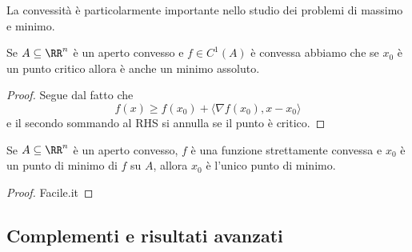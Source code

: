 \documentclass[11pt]{scrartcl}
\begin{document}
	La convessità è particolarmente importante nello studio dei problemi di massimo e minimo.
	\begin{proposition}
		Se $A\subseteq\RR^n$ è un aperto convesso e $f\in C^1(A)$ è convessa abbiamo che se $x_0$ è un punto critico allora è anche un minimo assoluto.
	\end{proposition}
	\begin{proof}
		Segue dal fatto che 
		$$f(x)\ge f(x_0)+\langle \nabla f(x_0),x-x_0\rangle$$
		e il secondo sommando al RHS si annulla se il punto è critico.
	\end{proof}
	\begin{proposition}
		Se $A\subseteq\RR^n$ è un aperto convesso, $f$ è una funzione strettamente convessa e $x_0$ è un punto di minimo di $f$ su $A$, allora $x_0$ è l'unico punto di minimo.
	\end{proposition}
	\begin{proof}
		Facile.it
	\end{proof}
	
	
	\subsection{Complementi e risultati avanzati}
	
\end{document}
